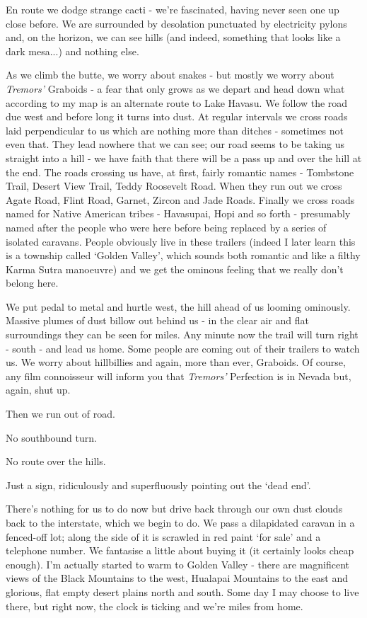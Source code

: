 \documentclass[a5paper,titlepage,draft]{book}
\begin{document}
En route we dodge strange cacti - we're fascinated, having never seen one up close before.  We are surrounded by desolation punctuated by electricity pylons and, on the horizon, we can see hills (and indeed, something that looks like a dark mesa...) and nothing else.

As we climb the butte, we worry about snakes - but mostly we worry about \emph{Tremors'} Graboids - a fear that only grows as we depart and head down what according to my map is an alternate route to Lake Havasu.  We follow the road due west and before long it turns into dust.  At regular intervals we cross roads laid perpendicular to us which are nothing more than ditches - sometimes not even that.  They lead nowhere that we can see; our road seems to be taking us straight into a hill - we have faith that there will be a pass up and over the hill at the end.  The roads crossing us have, at first, fairly romantic names - Tombstone Trail, Desert View Trail, Teddy Roosevelt Road.  When they run out we cross Agate Road, Flint Road, Garnet, Zircon and Jade Roads.  Finally we cross roads named for Native American tribes - Havasupai, Hopi and so forth - presumably named after the people who were here before being replaced by a series of isolated caravans.  People obviously live in these trailers (indeed I later learn this is a township called `Golden Valley', which sounds both romantic and like a filthy Karma Sutra manoeuvre) and we get the ominous feeling that we really don't belong here.

We put pedal to metal and hurtle west, the hill ahead of us looming ominously.  Massive plumes of dust billow out behind us - in the clear air and flat surroundings they can be seen for miles.  Any minute now the trail will turn right - south - and lead us home.  Some people are coming out of their trailers to watch us.  We worry about hillbillies and again, more than ever, Graboids.  Of course, any film connoisseur will inform you that \emph{Tremors'} Perfection is in Nevada but, again, shut up.

Then we run out of road.

No southbound turn.

No route over the hills.

Just a sign, ridiculously and superfluously pointing out the `dead end'.

There's nothing for us to do now but drive back through our own dust clouds back to the interstate, which we begin to do.  We pass a dilapidated caravan in a fenced-off lot; along the side of it is scrawled in red paint `for sale' and a telephone number.  We fantasise a little about buying it (it certainly looks cheap enough).  I'm actually started to warm to Golden Valley - there are magnificent views of the Black Mountains to the west, Hualapai Mountains to the east and glorious, flat empty desert plains north and south.  Some day I may choose to live there, but right now, the clock is ticking and we're miles from home.
\end{document}
